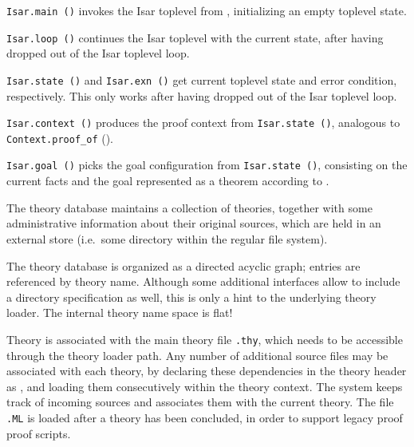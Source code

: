 \begin{isabellebody}
\begin{isamarkuptext}
  \begin{description}

  \item \verb|Isar.main ()| invokes the Isar toplevel from {\ML},
  initializing an empty toplevel state.

  \item \verb|Isar.loop ()| continues the Isar toplevel with the
  current state, after having dropped out of the Isar toplevel loop.

  \item \verb|Isar.state ()| and \verb|Isar.exn ()| get current
  toplevel state and error condition, respectively.  This only works
  after having dropped out of the Isar toplevel loop.

  \item \verb|Isar.context ()| produces the proof context from \verb|Isar.state ()|, analogous to \verb|Context.proof_of|
  ().

  \item \verb|Isar.goal ()| picks the goal configuration from \verb|Isar.state ()|, consisting on the current facts and the goal
  represented as a theorem according to .

  \end{description}%
\end{isamarkuptext}%
\isamarkuptrue%
%
\endisatagmlref
{\isafoldmlref}%
%
\isadelimmlref
%
\endisadelimmlref
%
\isamarkuptrue%
%
\begin{isamarkuptext}%
The theory database maintains a collection of theories, together
  with some administrative information about their original sources,
  which are held in an external store (i.e.\ some directory within the
  regular file system).

  The theory database is organized as a directed acyclic graph;
  entries are referenced by theory name.  Although some additional
  interfaces allow to include a directory specification as well, this
  is only a hint to the underlying theory loader.  The internal theory
  name space is flat!

  Theory  is associated with the main theory file \verb,.thy,, which needs to be accessible through the theory
  loader path.  Any number of additional {\ML} source files may be
  associated with each theory, by declaring these dependencies in the
  theory header as \isa{{\isasymUSES}}, and loading them consecutively
  within the theory context.  The system keeps track of incoming {\ML}
  sources and associates them with the current theory.  The file
  \verb,.ML, is loaded after a theory has been concluded, in
  order to support legacy proof {\ML} proof scripts.


\end{isamarkuptext}
\end{isabellebody}
